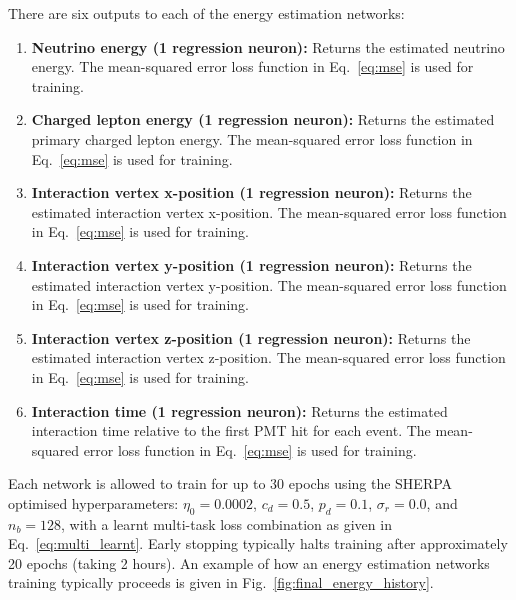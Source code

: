 There are six outputs to each of the energy estimation networks:
\begin{enumerate}
    \item \textbf{Neutrino energy (1 regression neuron):} Returns the estimated neutrino energy.
          The mean-squared error loss function in Eq.~\ref{eq:mse} is used for training.
    \item \textbf{Charged lepton energy (1 regression neuron):} Returns the estimated primary
          charged lepton energy. The mean-squared error loss function in Eq.~\ref{eq:mse} is used
          for training.
    \item \textbf{Interaction vertex x-position (1 regression neuron):} Returns the estimated
          interaction vertex x-position. The mean-squared error loss function in Eq.~\ref{eq:mse}
          is used for training.
    \item \textbf{Interaction vertex y-position (1 regression neuron):} Returns the estimated
          interaction vertex y-position. The mean-squared error loss function in Eq.~\ref{eq:mse}
          is used for training.
    \item \textbf{Interaction vertex z-position (1 regression neuron):} Returns the estimated
          interaction vertex z-position. The mean-squared error loss function in Eq.~\ref{eq:mse}
          is used for training.
    \item \textbf{Interaction time (1 regression neuron):} Returns the estimated interaction time
          relative to the first PMT hit for each event. The mean-squared error loss function in
          Eq.~\ref{eq:mse} is used for training.
\end{enumerate}

Each network is allowed to train for up to 30 epochs using the SHERPA optimised hyperparameters:
$\eta_{0}=0.0002$, $c_{d}=0.5$, $p_{d}=0.1$, $\sigma_{r}=0.0$, and $n_{b}=128$, with a learnt
multi-task loss combination as given in Eq.~\ref{eq:multi_learnt}. Early stopping typically halts
training after approximately 20 epochs (taking 2 hours). An example of how an energy estimation
networks training typically proceeds is given in Fig.~\ref{fig:final_energy_history}.

